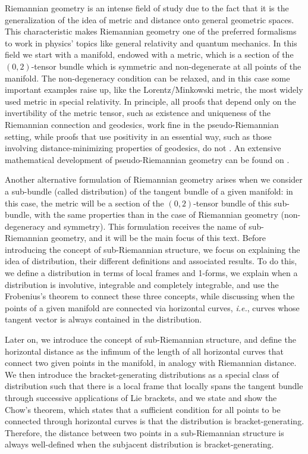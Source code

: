 \documentclass[12pt, letterpaper, reqno]{amsart}
\theoremstyle{definition}
\theoremstyle{plain}
\theoremstyle{remark}
\begin{document}
Riemannian geometry is an intense field of study due to the fact that it is the generalization of the idea of metric and distance onto general geometric spaces. This characteristic makes Riemannian geometry one of the preferred formalisms to work in physics' topics like general relativity and quantum mechanics. In this field we start with a manifold, endowed with a metric, which is a section of the $ (0,2) $-tensor bundle which is symmetric and non-degenerate at all points of the manifold. The non-degeneracy condition can be relaxed, and in this case some important examples raise up, like the Lorentz/Minkowski metric, the most widely used metric in special relativity. In principle, all proofs that depend only on the invertibility of the metric tensor, such as existence and uniqueness of the Riemannian connection and geodesics, work fine in the pseudo-Riemannian setting, while proofs that use positivity in an essential way, such as those involving distance-minimizing properties of geodesics, do not \cite[p.~31]{lee2018introduction}. An extensive mathematical development of pseudo-Riemannian geometry can be found on \cite{o1983semi}.

Another alternative formulation of Riemannian geometry arises when we consider a sub-bundle (called distribution) of the tangent bundle of a given manifold: in this case, the metric will be a section of the $ (0,2) $-tensor bundle of this sub-bundle, with the same properties than in the case of Riemannian geometry (non-degeneracy and symmetry). This formulation receives the name of sub-Riemannian geometry, and it will be the main focus of this text. Before introducing the concept of sub-Riemannian structure, we focus on explaining the idea of distribution, their different definitions and associated results. To do this, we define a distribution in terms of local frames and 1-forms, we explain when a distribution is involutive, integrable and completely integrable, and use the Frobenius's theorem to connect these three concepts, while discussing when the points of a given manifold are connected via horizontal curves, \textit{i.e.}, curves whose tangent vector is always contained in the distribution.

Later on, we introduce the concept of sub-Riemannian structure, and define the horizontal distance as the infimum of the length of all horizontal curves that connect two given points in the manifold, in analogy with Riemannian distance. We then introduce the bracket-generating distributions as a special class of distribution such that there is a local frame that locally spans the tangent bundle through successive applications of Lie brackets, and we state and show the Chow's theorem, which states that a sufficient condition for all points to be connected through horizontal curves is that the distribution is bracket-generating. Therefore, the distance between two points in a sub-Riemannian structure is always well-defined when the subjacent distribution is bracket-generating. 
\end{document}
